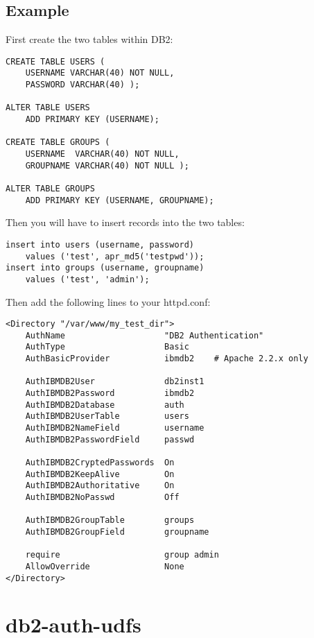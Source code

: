 \documentclass[11pt,a4paper]{article}
\begin{document}
\subsection{Example}
First create the two tables within DB2:
\begin{verbatim}
CREATE TABLE USERS (
    USERNAME VARCHAR(40) NOT NULL,
    PASSWORD VARCHAR(40) );

ALTER TABLE USERS
    ADD PRIMARY KEY (USERNAME);

CREATE TABLE GROUPS (
    USERNAME  VARCHAR(40) NOT NULL,
    GROUPNAME VARCHAR(40) NOT NULL );

ALTER TABLE GROUPS
    ADD PRIMARY KEY (USERNAME, GROUPNAME);
\end{verbatim}
Then you will have to insert records into the two tables:
\begin{verbatim}
insert into users (username, password)
    values ('test', apr_md5('testpwd'));
insert into groups (username, groupname) 
    values ('test', 'admin');
\end{verbatim}
Then add the following lines to your httpd.conf:
\begin{verbatim}
<Directory "/var/www/my_test_dir">
    AuthName                    "DB2 Authentication"
    AuthType                    Basic
    AuthBasicProvider           ibmdb2    # Apache 2.2.x only

    AuthIBMDB2User              db2inst1
    AuthIBMDB2Password          ibmdb2
    AuthIBMDB2Database          auth
    AuthIBMDB2UserTable         users
    AuthIBMDB2NameField         username
    AuthIBMDB2PasswordField     passwd

    AuthIBMDB2CryptedPasswords  On
    AuthIBMDB2KeepAlive         On
    AuthIBMDB2Authoritative     On
    AuthIBMDB2NoPasswd          Off

    AuthIBMDB2GroupTable        groups
    AuthIBMDB2GroupField        groupname

    require                     group admin
    AllowOverride               None
</Directory>
\end{verbatim}
\newpage

\section{db2-auth-udfs}
\end{document}
